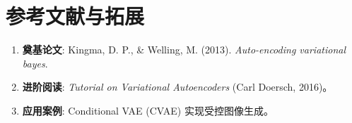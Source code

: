 \documentclass[12pt, a4paper]{article}
\begin{document}
\section{参考文献与拓展}
\begin{enumerate}
    \item \textbf{奠基论文}: Kingma, D. P., & Welling, M. (2013). \textit{Auto-encoding variational bayes}.
    \item \textbf{进阶阅读}: \textit{Tutorial on Variational Autoencoders} (Carl Doersch, 2016)。
    \item \textbf{应用案例}: Conditional VAE (CVAE) 实现受控图像生成。
\end{enumerate}
\end{document}
